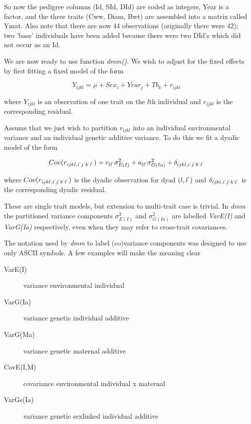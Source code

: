 \documentclass[titlepage]{article}  %
\begin{document}
 So now the pedigree columns (Id, SId, DId) are coded as integers, Year is a factor, and the three traits (Cww, Diam, Bwt) are assembled into a matrix called Ymat. Also note that there are now 44 observations (originally there were 42); two 'base' individuals have been added  because there were two DId's which did not occur as an Id.

 We are now ready to use function {\em dmm()}. We wish to adjust for the fixed effects by first fitting a fixed model of the form

\begin{displaymath}
Y_{ijkl} = \mu + Sex_{i} + Year_{j} + Tb_{k} + r_{ijkl}
\end{displaymath}

where $Y_{ijkl}$ is an observation of one trait on the $l$th individual and $r_{ijkl}$ is the corresponding residual.

Assume that we just wish to partition $r_{ijkl}$ into an individual environmental variance and an individual genetic additive variance. To do this we fit a dyadic model of the form

\begin{displaymath}
Cov(r_{ijkl,i^{`}j^{`}k^{`}l^{`}}) = e_{ll^{`}}\sigma^{2}_{E(I)} + a_{ll^{`}}\sigma^{2}_{G(Ia)} + \delta_{ijkl,i^{`}j^{`}k^{`}l^{`}}
\end{displaymath}

where $Cov(r_{ijkl,i^{`}j^{`}k^{`}l^{`}})$ is the dyadic observation for dyad $(l,l^{`})$ and $\delta_{ijkl,i^{`}j^{`}k^{`}l^{`}}$ is the corresponding dyadic residual.

These are single trait models, but extension to multi-trait case is trivial. In {\em dmm} the partitioned variance components $\sigma^{2}_{E(I)}$ and $\sigma^{2}_{G(Ia)}$ are labelled {\em VarE(I)} and {\em VarG(Ia)} respectively, even when they may refer to cross-trait covariances.

The notation used by {\em dmm} to label (co)variance components was designed to use only ASCII symbols. A few examples will make the meaning clear

\begin{description}
\item[VarE(I)] variance environmental individual
\item[VarG(Ia)] variance genetic individual additive
\item[VarG(Ma)] variance genetic maternal additive
\item[CovE(I,M)] covariance environmental individual x maternal
\item[VarGs(Ia)] variance genetic sexlinked individual additive
\end{description}
\end{document}
